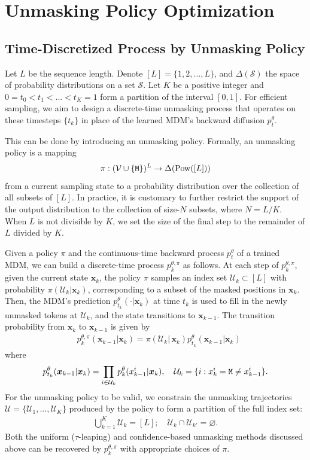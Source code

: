 \section{Unmasking Policy Optimization}\label{sec:theory}
\subsection{Time-Discretized Process by Unmasking Policy}
Let $L$ be the sequence length. Denote $[L]=\{1,2,...,L\}$, and $\Delta(\mathcal S)$ the space of probability distributions on a set $\mathcal S$. Let $K$ be a positive integer and $0=t_0<t_1<...<t_K=1$ form a partition of the interval $[0,1]$. For efficient sampling, we aim to design a discrete-time unmasking process that operates on these timesteps $\{t_k\}$ in place of the learned MDM's backward diffusion $p_t^\theta$.

This can be done by introducing an unmasking policy. Formally, an unmasking policy is a mapping $$\pi:(\mathcal V\cup\{\texttt{M}\})^L\to\Delta(\mathrm{Pow}([L]))$$ from a current sampling state to a probability distribution over the collection of all subsets of $[L]$. In practice, it is customary to further restrict the support of the output distribution to the collection of size-$N$ subsets, where $N=L/K$. When $L$ is not divisible by $K$, we set the size of the final step to the remainder of $L$ divided by $K$.

Given a policy $\pi$ and the continuous-time backward process $p_t^\theta$ of a trained MDM, we can build a discrete-time process $p^{\theta,\pi}_k$ as follows. At each step of $p^{\theta,\pi}_k$, given the current state $\bm x_k$, the policy $\pi$ samples an index set $\mathcal U_k\subset[L]$ with probability $\pi(\mathcal U_k|\bm x_k)$, corresponding to a subset of the masked positions in $\bm x_k$. Then, the MDM's prediction $p_{t_k}^\theta(\cdot|\bm x_k)$ at time $t_k$ is used to fill in the newly unmasked tokens at $\mathcal U_k$, and the state transitions to $\bm x_{k-1}$. The transition probability from $\bm x_k$ to $\bm x_{k-1}$ is given by
\begin{align}\label{eq:policy-decompose}
    &{p}^{\theta, \pi}_{k}(\bm x_{k-1}|\bm x_k)
    =\pi(\mathcal U_k|\,\bm x_k)p^\theta_{t_k}(\bm x_{k-1}|\bm x_k)
\end{align}
where
\begin{align*}
    p^\theta_{t_k}(\bm x_{k-1}|\bm x_k)=\prod_{i\in\mathcal U_k}p^\theta_{k}(x_{k-1}^i|\bm x_k),\quad\mathcal U_k=\{i:x_k^i=\texttt{M}\neq x_{k-1}^i\}.
\end{align*}
For the unmasking policy to be valid, we constrain the unmasking trajectories $\mathcal{U} = \{\mathcal U_1,...,\mathcal U_K\}$ produced by the policy to form a partition of the full index set:
\begin{align*}
    \bigcup_{k=1}^K\mathcal U_k=[L];\quad  \mathcal U_k\cap\mathcal U_{k'}=\varnothing.
\end{align*}
Both the uniform ($\tau$-leaping) and confidence-based unmasking methods discussed above can be recovered by $p_k^{\theta,\pi}$ with appropriate choices of $\pi$.

